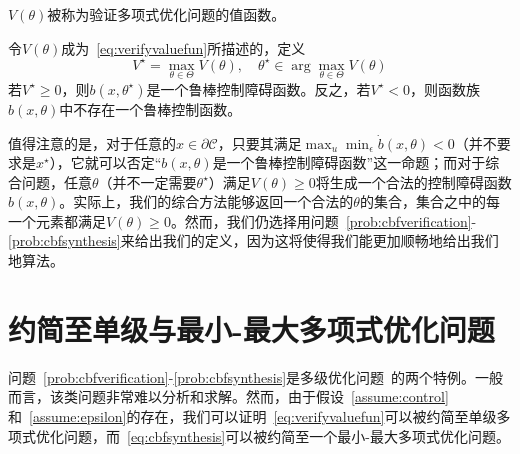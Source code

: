 $V(\theta)$被称为验证多项式优化问题的值函数。

\begin{problem}[综合问题]\label{prob:cbfsynthesis}
    令$V(\theta)$成为~\eqref{eq:verifyvaluefun}所描述的，定义
    \begin{equation}\label{eq:cbfsynthesis}
        V^\star = \max_{\theta \in \Theta} V(\theta), \quad \theta^\star \in \arg\max_{\theta \in \Theta} V(\theta)
    \end{equation}
    若$V^\star \ge 0$，则$b(x, \theta^\star)$是一个鲁棒控制障碍函数。反之，若$V^\star < 0$，则函数族$b(x, \theta)$中不存在一个鲁棒控制函数。
\end{problem}

值得注意的是，对于任意的$x \in \partial \mathcal{C}$，只要其满足$\max_u \min_\epsilon \dot{b}(x, \theta) < 0$（并不要求是$x^\star$），它就可以否定“$b(x, \theta)$是一个鲁棒控制障碍函数”这一命题；而对于综合问题，任意$\theta$（并不一定需要$\theta^\star$）满足$V(\theta) \ge 0$将生成一个合法的控制障碍函数$b(x, \theta)$。实际上，我们的综合方法能够返回一个合法的$\theta$的集合，集合之中的每一个元素都满足$V(\theta) \ge 0$。然而，我们仍选择用问题~\ref{prob:cbfverification}-\ref{prob:cbfsynthesis}来给出我们的定义，因为这将使得我们能更加顺畅地给出我们地算法。

\section{约简至单级与最小-最大多项式优化问题}
\label{sec:formulation:reduction}
问题~\ref{prob:cbfverification}-\ref{prob:cbfsynthesis}是多级优化问题~\cite{bennett22mp-hierarchical}的两个特例。一般而言，该类问题非常难以分析和求解。然而，由于假设~\ref{assume:control}和~\ref{assume:epsilon}的存在，我们可以证明~\eqref{eq:verifyvaluefun}可以被约简至单级多项式优化问题，而~\eqref{eq:cbfsynthesis}可以被约简至一个最小-最大多项式优化问题。

